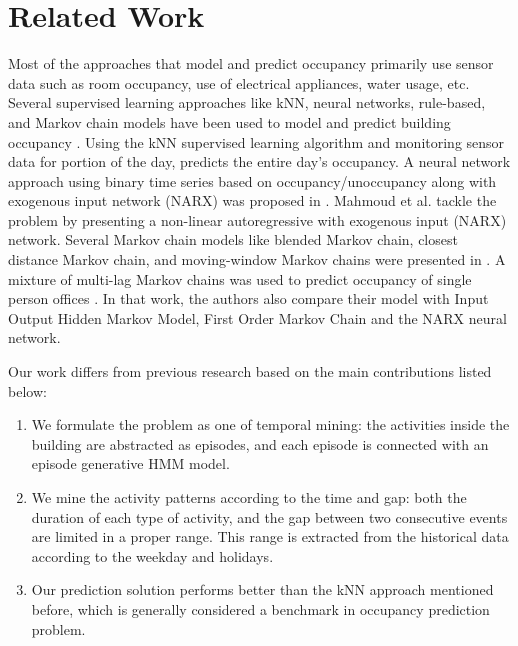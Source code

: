 \section{Related Work}
Most of the approaches that model and predict occupancy primarily use sensor data 
such as room occupancy, use of electrical appliances, water usage, etc.
Several supervised learning approaches like kNN, neural networks, rule-based, 
and Markov chain models have been used to model and predict building occupancy 
\cite{scott2011preheat, alrazgan2011learning, mahmoud2010occupancy, mahmoud2013behavioural, erickson2014occupancy, beltran2014optimal}.  
Using the kNN supervised learning algorithm and monitoring sensor data 
for portion of the day, 
\cite{scott2011preheat} predicts the entire day's occupancy. 
A neural network approach using binary time series based on 
occupancy/unoccupancy along with exogenous input network (NARX) was 
proposed in \cite{mahmoud2010occupancy, mahmoud2013behavioural}. 
Mahmoud et al. tackle the problem by presenting a non-linear autoregressive 
with exogenous input (NARX) network. 
Several Markov chain models like blended Markov chain, 
closest distance Markov chain, 
and moving-window Markov chains were presented in \cite{erickson2014occupancy}. 
A mixture of multi-lag Markov chains was used to predict occupancy of 
single person offices \cite{manna2013learning}. 
In that work, the authors also compare their model with Input Output Hidden Markov Model, 
First Order Markov Chain and the NARX neural network. 

Our work differs from previous research based on the main contributions listed below:
\begin{enumerate}
\item We formulate the problem as one of temporal mining: the activities inside the building are abstracted as episodes, and each episode is connected with an episode generative HMM model.
\item We mine the activity patterns according to the time and gap: both the duration of each type of 
activity, and the gap between two consecutive events are limited in a proper range. 
This range is extracted from the historical data according to the weekday and holidays.
\item Our prediction solution performs better than the kNN approach mentioned before, 
which is generally considered a benchmark in occupancy prediction problem. 
\end{enumerate}

